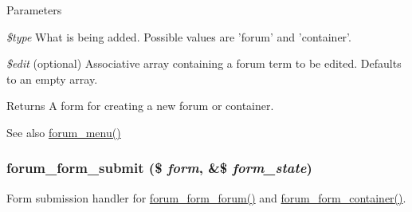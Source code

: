 \begin{DoxyParams}{Parameters}
\item[{\em \$type}]What is being added. Possible values are 'forum' and 'container'. \item[{\em \$edit}](optional) Associative array containing a forum term to be edited. Defaults to an empty array.\end{DoxyParams}
\begin{DoxyReturn}{Returns}
A form for creating a new forum or container.
\end{DoxyReturn}
\begin{DoxySeeAlso}{See also}
\hyperlink{forum_8module_a0421197a60856c7ee2cf2511f0d54ffc}{forum\_\-menu()} 
\end{DoxySeeAlso}
\hypertarget{forum_8admin_8inc_a517cd1e23374b0242a197a3c5250a0c9}{
\subsubsection[{forum\_\-form\_\-submit}]{\setlength{\rightskip}{0pt plus 5cm}forum\_\-form\_\-submit (\$ {\em form}, \/  \&\$ {\em form\_\-state})}}
\label{forum_8admin_8inc_a517cd1e23374b0242a197a3c5250a0c9}
Form submission handler for \hyperlink{group__forms_ga74d0d5997a52e44a382cd6792b8718dc}{forum\_\-form\_\-forum()} and \hyperlink{group__forms_gaaf28a1fc0cf33c8cc9f8ffd08fad202c}{forum\_\-form\_\-container()}. 